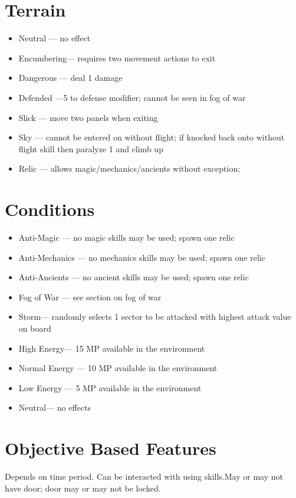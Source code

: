\section{Terrain}
\begin{itemize}
\item Neutral --- no effect
\item Encumbering--- requires two movement actions to exit
\item Dangerous --- deal 1 damage
\item Defended ---5 to defense modifier; cannot be seen in fog of war
\item Slick --- move two panels when exiting
\item Sky --- cannot be entered on without flight; if knocked back onto without flight skill then paralyze 1 and climb up
\item Relic --- allows magic/mechanics/ancients without exception; 
\end{itemize}

\section{Conditions}
\begin{itemize}
\item Anti-Magic --- no magic skills may be used; spawn one relic
\item Anti-Mechanics --- no mechanics skills may be used; spawn one relic
\item Anti-Ancients --- no ancient skills may be used; spawn one relic
\item Fog of War --- see section on fog of war
\item Storm--- randomly selects 1 sector to be attacked with highest attack value on board
\item High Energy--- 15 MP available in the environment
\item Normal Energy --- 10 MP available in the environment
\item Low Energy --- 5 MP available in the environment
\item Neutral--- no effects
\end{itemize}

\section{Objective Based Features}
Depends on time period.  Can be interacted with using skills.May or may not have door; door may or may not be locked.

